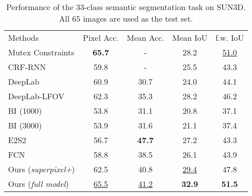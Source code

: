 \begin{table}[t!]
\scriptsize
  \begin{center}
    \caption{Performance of the 33-class semantic segmentation task on SUN3D. All 65 images are used as the test set. }
    \label{table:sun3d}
    \begin{tabular}{lcccc}
      \toprule
      Methods & Pixel Acc. & Mean Acc. & Mean IoU & f.w. IoU \\
      \cmidrule(lr){1-1}\cmidrule(lr){2-5}
Mutex Constraints \cite{deng2015semantic}     & \textbf{65.7}  & - & 28.2 & \underline{51.0} \\
      CRF-RNN \cite{crfasrnn_iccv2015}     & 59.8  & -  & 25.5 & 43.3 \\
      DeepLab \cite{chen2014semantic}      & 60.9  & 30.7   & 24.0 & 44.1 \\
      DeepLab-LFOV \cite{chen2016deeplab}    & 62.3  & 35.3   & 28.2 & 46.2 \\
      BI (1000) \cite{raghudeep2015spCNN}   & 53.8 & 31.1 & 20.8 & 37.1 \\
      BI (3000) \cite{raghudeep2015spCNN}   & 53.9 & 31.6 & 21.1 & 37.4 \\
      E2S2 \cite{region_end2end2016eccv}     & 56.7  & \textbf{47.7}  & 27.2  & 43.3  \\
      FCN \cite{long2015fully}     & 58.8  & 38.5 & 26.1 & 43.9 \\
      \cmidrule(lr){1-1}\cmidrule(lr){2-5}
      Ours (\textit{superpixel+}) & {62.5}  & 40.8   & \underline{29.4} & {47.8} \\
      Ours (\textit{full model}) & \underline{65.5}  & \underline{41.2}   & \textbf{32.9} & \textbf{51.5} \\
      \bottomrule
    \end{tabular}
  \end{center}
\end{table}

